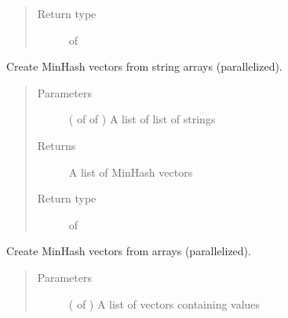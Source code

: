 \documentclass[letterpaper,10pt,english]{sphinxmanual}
\begin{document}
\begin{fulllineitems}
\begin{fulllineitems}
\begin{quote}
\begin{description}
\item[{Return type}] \leavevmode
{} of 

\end{description}\end{quote}

\end{fulllineitems}


\begin{fulllineitems}
\label{\detokenize{documentation:tmap.Minhash.batch_from_string_array}}
Create MinHash vectors from string arrays (parallelized).
\begin{quote}\begin{description}
\item[{Parameters}] \leavevmode
{} ( of  of ) \textendash{} A list of list of strings

\item[{Returns}] \leavevmode
A list of MinHash vectors

\item[{Return type}] \leavevmode
{} of 

\end{description}\end{quote}

\end{fulllineitems}


\begin{fulllineitems}
\label{\detokenize{documentation:tmap.Minhash.batch_from_weight_array}}
Create MinHash vectors from  arrays (parallelized).
\begin{quote}\begin{description}
\item[{Parameters}] \leavevmode
{} ( of ) \textendash{} A list of vectors containing  values


\end{description}
\end{quote}
\end{fulllineitems}
\end{fulllineitems}
\end{document}
